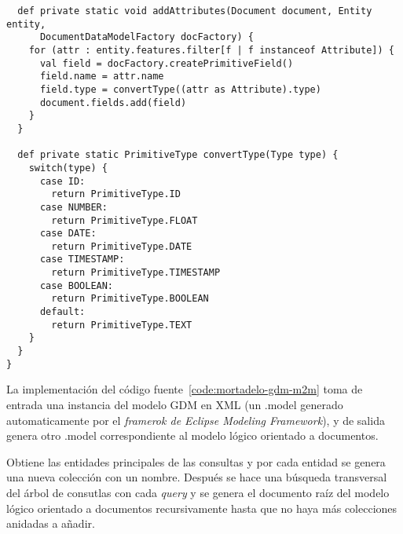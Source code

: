 \begin{code}
\begin{verbatim}
  def private static void addAttributes(Document document, Entity entity,
      DocumentDataModelFactory docFactory) {
    for (attr : entity.features.filter[f | f instanceof Attribute]) {
      val field = docFactory.createPrimitiveField()
      field.name = attr.name
      field.type = convertType((attr as Attribute).type)
      document.fields.add(field)
    }
  }

  def private static PrimitiveType convertType(Type type) {
    switch(type) {
      case ID:
        return PrimitiveType.ID
      case NUMBER:
        return PrimitiveType.FLOAT
      case DATE:
        return PrimitiveType.DATE
      case TIMESTAMP:
        return PrimitiveType.TIMESTAMP
      case BOOLEAN:
        return PrimitiveType.BOOLEAN
      default:
        return PrimitiveType.TEXT
    }
  }
}

\end{verbatim}
\end{code}

La implementación del código fuente~\ref{code:mortadelo-gdm-m2m} toma de entrada una instancia del modelo GDM en XML (un .model generado automaticamente por el \textit{framerok de Eclipse Modeling Framework}), y de salida genera otro .model correspondiente al modelo lógico orientado a documentos.

Obtiene las entidades principales de las consultas y por cada entidad se genera una nueva colección con un nombre. Después se hace una búsqueda transversal del árbol de consutlas con cada \textit{query} y se genera el documento raíz del modelo lógico orientado a documentos recursivamente hasta que no haya más colecciones anidadas a añadir.